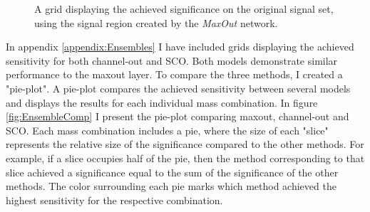 \begin{figure}
    \caption{A grid displaying the achieved significance on the original signal set, using the signal region 
    created by the \emph{MaxOut} network.}
    \label{fig:MaxOutGridSig}
\end{figure}
In appendix \ref{appendix:Ensembles} I have included grids displaying the achieved sensitivity for both channel-out and \ac{SCO}. Both 
models demonstrate similar performance to the maxout layer. To compare the three methods, I created a "pie-plot". A pie-plot 
compares the achieved sensitivity between several models and displays the results for each individual mass combination.  In figure 
\ref{fig:EnsembleComp} I present the pie-plot comparing maxout, channel-out and \ac{SCO}. Each mass combination includes a pie, where 
the size of each "slice" represents the relative size of the significance compared to the other methods. For example, if a slice occupies 
half of the pie, then the method corresponding to that slice achieved a significance equal to the sum of the significance of the other methods.
The color surrounding each pie marks which method achieved the highest sensitivity for the respective combination.
\\
